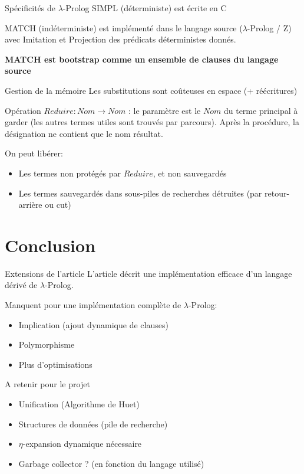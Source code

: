 \documentclass[aspectratio=169]{beamer}
\begin{document}
\begin{frame}{Spécificités de $\lambda$-Prolog}
  SIMPL (déterministe) est écrite en C

  MATCH (indéterministe) est implémenté dans le langage source ($\lambda$-Prolog / Z) avec Imitation et Projection des prédicats déterministes donnés.

  \textbf{MATCH est bootstrap comme un ensemble de clauses du langage source}
\end{frame}

\begin{frame}{Gestion de la mémoire}
  Les substitutions sont coûteuses en espace (+ réécritures)

  Opération $Reduire : Nom \rightarrow Nom$ : le paramètre est le $Nom$ du terme principal à garder (les autres termes utiles sont trouvés par parcours). Après la procédure, la désignation ne contient que le nom résultat.

  On peut libérer:
  \begin{itemize}
    \item Les termes non protégés par $Reduire$, et non sauvegardés
    \item Les termes sauvegardés dans sous-piles de recherches détruites (par retour-arrière ou cut)
  \end{itemize}
\end{frame}

\section{Conclusion}

\begin{frame}{Extensions de l'article}
  L'article décrit une implémentation efficace d'un langage dérivé de $\lambda$-Prolog.

  Manquent pour une implémentation complète de $\lambda$-Prolog:
  \begin{itemize}
    \item Implication (ajout dynamique de clauses)
    \item Polymorphisme
    \item Plus d'optimisations
  \end{itemize}
\end{frame}

\begin{frame}{A retenir pour le projet}
  \begin{itemize}
    \item Unification (Algorithme de Huet)
    \item Structures de données (pile de recherche)
    \item $\eta$-expansion dynamique nécessaire
    \item Garbage collector ? (en fonction du langage utilisé)
  \end{itemize}
\end{frame}
\end{document}
